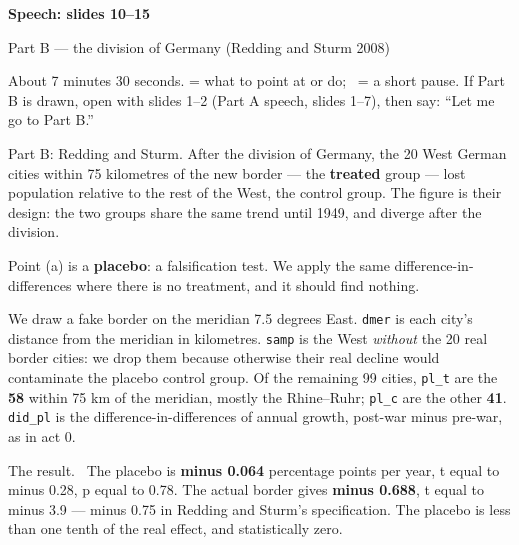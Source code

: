 \newcommand{\speechpart}{Part B, slides 10--15}


{\color{unicablue}\Huge\bfseries Speech: slides 10--15\par}
\vspace{2pt}
{\Large Part B --- the division of Germany (Redding and Sturm 2008)\par}
\vspace{4pt}
{\small About 7 minutes 30 seconds.  = what to point at or do; \pause\ = a short pause. If Part B is drawn, open with slides 1--2 (Part A speech, slides 1--7), then say: ``Let me go to Part B.''}

\begin{say}
 Part B: Redding and Sturm. After the division of Germany, the 20 West German cities within 75 kilometres of the new border --- the \textbf{treated} group --- lost population relative to the rest of the West, the control group. The figure is their design: the two groups share the same trend until 1949, and diverge after the division.

Point (a) is a \textbf{placebo}: a falsification test. We apply the same difference-in-differences where there is no treatment, and it should find nothing.

 We draw a fake border on the meridian 7.5 degrees East. \texttt{dmer} is each city's distance from the meridian in kilometres. \texttt{samp} is the West \emph{without} the 20 real border cities: we drop them because otherwise their real decline would contaminate the placebo control group. Of the remaining 99 cities, \texttt{pl\_t} are the \textbf{58} within 75 km of the meridian, mostly the Rhine--Ruhr; \texttt{pl\_c} are the other \textbf{41}. \texttt{did\_pl} is the difference-in-differences of annual growth, post-war minus pre-war, as in act 0.

 The result. \pause\ The placebo is \textbf{minus 0.064} percentage points per year, t equal to minus 0.28, p equal to 0.78. The actual border gives \textbf{minus 0.688}, t equal to minus 3.9 --- minus 0.75 in Redding and Sturm's specification. The placebo is less than one tenth of the real effect, and statistically zero.
\end{say}

